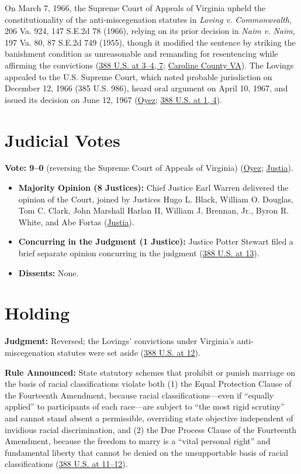 \documentclass[12pt]{article}
\begin{document}
On March 7, 1966, the Supreme Court of Appeals of Virginia upheld the constitutionality of the anti-miscegenation statutes in \textit{Loving v. Commonwealth}, 206 Va. 924, 147 S.E.2d 78 (1966), relying on its prior decision in \textit{Naim v. Naim}, 197 Va. 80, 87 S.E.2d 749 (1955), though it modified the sentence by striking the banishment condition as unreasonable and remanding for resentencing while affirming the convictions (\href{https://supreme.justia.com/cases/federal/us/388/1/}{388 U.S. at 3--4, 7}; \href{https://co.caroline.va.us/308/The-Lovings}{Caroline County VA}). The Lovings appealed to the U.S. Supreme Court, which noted probable jurisdiction on December 12, 1966 (385 U.S. 986), heard oral argument on April 10, 1967, and issued its decision on June 12, 1967 (\href{https://www.oyez.org/cases/1966/395}{Oyez}; \href{https://supreme.justia.com/cases/federal/us/388/1/}{388 U.S. at 1, 4}).

\section{Judicial Votes}
\textbf{Vote: 9--0} (reversing the Supreme Court of Appeals of Virginia) (\href{https://www.oyez.org/cases/1966/395}{Oyez}; \href{https://supreme.justia.com/cases/federal/us/388/1/}{Justia}).
\begin{itemize}
\item \textbf{Majority Opinion (8 Justices):} Chief Justice Earl Warren delivered the opinion of the Court, joined by Justices Hugo L. Black, William O. Douglas, Tom C. Clark, John Marshall Harlan II, William J. Brennan, Jr., Byron R. White, and Abe Fortas (\href{https://supreme.justia.com/cases/federal/us/388/1/}{Justia}).
\item \textbf{Concurring in the Judgment (1 Justice):} Justice Potter Stewart filed a brief separate opinion concurring in the judgment (\href{https://supreme.justia.com/cases/federal/us/388/1/}{388 U.S. at 13}).
\item \textbf{Dissents:} None.
\end{itemize}

\section{Holding}
\textbf{Judgment:} Reversed; the Lovings' convictions under Virginia's anti-miscegenation statutes were set aside (\href{https://supreme.justia.com/cases/federal/us/388/1/}{388 U.S. at 12}).

\textbf{Rule Announced:} State statutory schemes that prohibit or punish marriage on the basis of racial classifications violate both (1) the Equal Protection Clause of the Fourteenth Amendment, because racial classifications---even if ``equally applied'' to participants of each race---are subject to ``the most rigid scrutiny'' and cannot stand absent a permissible, overriding state objective independent of invidious racial discrimination, and (2) the Due Process Clause of the Fourteenth Amendment, because the freedom to marry is a ``vital personal right'' and fundamental liberty that cannot be denied on the unsupportable basis of racial classifications (\href{https://supreme.justia.com/cases/federal/us/388/1/}{388 U.S. at 11--12}).
\end{document}
